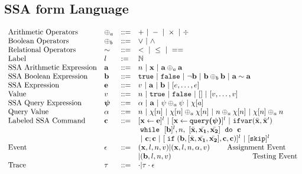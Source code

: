 %
%
\subsection{SSA form Language}
\[
\begin{array}{llll}
 \mbox{Arithmetic Operators} 
& \oplus_a & ::= & + ~|~ - ~|~ \times 
%
~|~ \div \\  
\mbox{Boolean Operators} 
& \oplus_b & ::= & \lor ~|~ \land
\\
\mbox{Relational Operators} 
& \sim & ::= & < ~|~ \leq ~|~ == 
\\  
%
\mbox{Label} 
& l & := & \mathbb{N} 
\\ 
%
\mbox{SSA Arithmetic Expression} 
& \saexpr & ::= & 
n ~|~ \ssa{x} ~|~ \saexpr \oplus_a \saexpr  
\\
%
\mbox{SSA Boolean Expression} & \sbexpr & ::= & 
	\etrue ~|~ \efalse  ~|~ \neg \sbexpr
	 ~|~ \sbexpr \oplus_b \sbexpr
	~|~ \saexpr \sim \saexpr 
	\\
%
\mbox{SSA Expression} & \sexpr & ::= & v ~|~ \saexpr \sep \sbexpr ~|~ [\expr, \dots, \expr]
\\  
%
\mbox{Value} 
& v & ::= & { n \sep \etrue \sep \efalse ~|~ [] ~|~ [v, \dots, v]}  
\\
%
\mbox{SSA Query Expression} 
& \ssa{\qexpr} & ::= 
& { \qval ~|~ \saexpr ~|~ \qexpr \oplus_a \qexpr ~|~ \chi[\aexpr]} 
\\
%
\mbox{Query Value} & \qval & ::= 
& {n ~|~ \chi[n] ~|~ \chi[n] \oplus_a  \chi[n] ~|~ n \oplus_a  \chi[n]
~|~ \chi[n] \oplus_a  n}
\\
%
\mbox{Labeled SSA Command} 
& \ssa{c} & ::= &   [\assign {\ssa{x}}{ \ssa{\expr}}]^{l} ~|~  [\assign {\ssa{x} } {\ssa{\query(\qexpr)}}]^{l}
%
~|~  {{\eifvar(\bar{\ssa{x}}, \bar{\ssa{x}}')}} 
%
\\ 
&&& 
{\ewhile ~ [ \sbexpr ]^{l} , n,
~ 
[\bar{\ssa{x}}, \bar{\ssa{x_1}}, \bar{\ssa{x_2}}] 
~ \edo ~  \ssa{c} }
\\
&&&
~|~ \ssa{c};\ssa{c}  
~|~ [\eif(\sbexpr, [\bar{\ssa{x}}, \bar{\ssa{x_1}}, \bar{\ssa{x_2}}] , \ssa{c}, \ssa{c})]^l 
~|~ [\eskip]^{l} 
\\
%
\mbox{Event} 
& \event & ::= & 
      (\ssa{x}, l, n, v) | (\ssa{x}, l, n, \qval, v)  ~~~~~~~ \mbox{Assignment Event} \\
&&& | (\sbexpr, l, n, v)   ~~~~~~~~~~~~~~~~~~~~~~~~~~~~~~~~~ \mbox{Testing Event}
\\
%
\mbox{Trace} & \vtrace
& ::= & \cdot | \vtrace \cdot \event
\end{array}
\]
